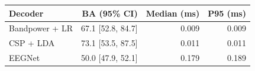 \begin{tabular}{lrrr}
\toprule
Decoder & BA (95\% CI) & Median (ms) & P95 (ms) \\
\midrule
Bandpower + LR & 67.1 [52.8, 84.7] & 0.009 & 0.009 \\
CSP + LDA & 73.1 [53.5, 87.5] & 0.011 & 0.011 \\
EEGNet & 50.0 [47.9, 52.1] & 0.179 & 0.189 \\
\bottomrule
\end{tabular}
